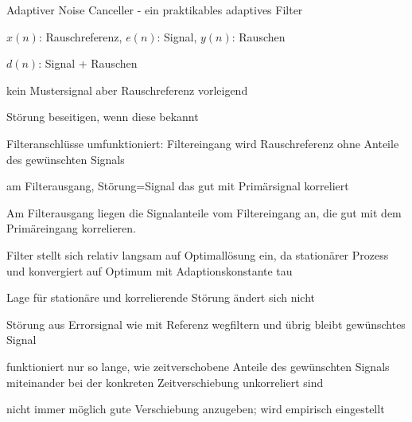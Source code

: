 \documentclass[a4paper]{article}
\begin{document}
\begin{multicols}{3}
  Adaptiver Noise Canceller - ein praktikables adaptives Filter
  \begin{itemize*}
    \item $x(n)$: Rauschreferenz, $e(n)$: Signal, $y(n)$: Rauschen
    \item $d(n)$: Signal + Rauschen
    \item kein Mustersignal aber Rauschreferenz vorleigend
    \item Störung beseitigen, wenn diese bekannt %
    \item Filteranschlüsse umfunktioniert: Filtereingang wird Rauschreferenz ohne Anteile des gewünschten Signals%
    \item am Filterausgang, Störung=Signal das gut mit Primärsignal korreliert %
    \item Am Filterausgang liegen die Signalanteile vom Filtereingang an, die gut mit dem Primäreingang korrelieren.
    \item Filter stellt sich relativ langsam auf Optimallösung ein, da stationärer Prozess und konvergiert auf Optimum mit Adaptionskonstante tau
    \item Lage für stationäre und korrelierende Störung ändert sich nicht %
    \item Störung aus Errorsignal wie mit Referenz wegfiltern und übrig bleibt gewünschtes Signal%
    \item funktioniert nur so lange, wie zeitverschobene Anteile des gewünschten Signals miteinander bei der konkreten Zeitverschiebung unkorreliert sind%
    \item nicht immer möglich gute Verschiebung anzugeben; wird empirisch eingestellt
  \end{itemize*}


\end{multicols}
\end{document}
